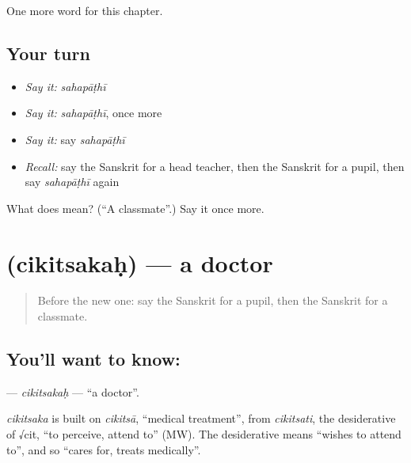 \begin{grammarlens}[title={What you've built}]
One more word for this chapter.
\end{grammarlens}

\subsection*{Your turn}
\begin{itemize}
\raggedright
  \item \emph{Say it:} \emph{sahapāṭhī}
  \item \emph{Say it:} \emph{sahapāṭhī}, once more
  \item \emph{Say it:} say \emph{sahapāṭhī}
  \item \emph{Recall:} say the Sanskrit for a head teacher, then the Sanskrit for a pupil, then say \emph{sahapāṭhī} again
\end{itemize}

\begin{tcolorbox}[breakable,colback=teal!4,colframe=teal!35!black,title={Before you move on}]
What does  mean? (\textquotedblleft{}A classmate\textquotedblright{}.) Say it once more.
\end{tcolorbox}
\section[\texorpdfstring{\sk{चिकित्सकः} (cikitsakaḥ)}{चिकित्सकः (cikitsakaḥ)}]{ (cikitsakaḥ) — a doctor}

\label{lesson:SA-C210-cikitsakah}



\begin{quote}
Before the new one: say the Sanskrit for a pupil, then the Sanskrit for a classmate.
\end{quote}

\subsection*{You'll want to know: }
\textbf{} — \emph{cikitsakaḥ} — \textquotedblleft{}a doctor\textquotedblright{}.

\begin{cousinweb}
\emph{cikitsaka} is built on \emph{cikitsā}, \textquotedblleft{}medical treatment\textquotedblright{}, from \emph{cikitsati}, the desiderative of √cit, \textquotedblleft{}to perceive, attend to\textquotedblright{} (MW). The desiderative means \textquotedblleft{}wishes to attend to\textquotedblright{}, and so \textquotedblleft{}cares for, treats medically\textquotedblright{}.
\end{cousinweb}

